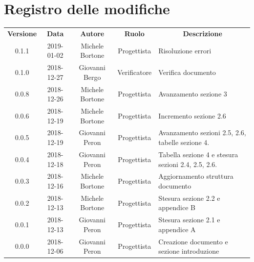 \documentclass[11pt,a4paper]{article}
\begin{document}
	
	\newpage
	\section*{\centering Registro delle modifiche}
	\begin{tabularx}{\textwidth}{ c | c | c | c | X }
		\rowcolor{LightBlue}
		\color{white}\bfseries Versione & \color{white}\bfseries Data & \color{white}\bfseries Autore & \color{white}\bfseries Ruolo & \multicolumn{1}{c}{\color{white}\bfseries Descrizione}\\[0.25cm]
		0.1.1 & 2019-01-02 & Michele Bortone & Progettista & Risoluzione errori\\ \hline
		0.1.0 & 2018-12-27 & Giovanni Bergo & Verificatore & Verifica documento\\ \hline
		0.0.8 & 2018-12-26 & Michele Bortone & Progettista & Avanzamento sezione 3\\ \hline
		0.0.6 & 2018-12-19 & Michele Bortone & Progettista & Incremento sezione 2.6\\ \hline
		0.0.5 & 2018-12-19 & Giovanni Peron & Progettista & Avanzamento sezioni 2.5, 2.6, tabelle sezione 4.\\ \hline
		0.0.4 & 2018-12-18 & Giovanni Peron & Progettista & Tabella sezione 4 e stesura sezioni 2.4, 2.5, 2.6.\\ \hline
		0.0.3 & 2018-12-16 & Michele Bortone & Progettista & Aggiornamento struttura documento\\ \hline
		0.0.2 & 2018-12-13 & Michele Bortone & Progettista & Stesura sezione 2.2  e appendice B\\ \hline
		0.0.1 & 2018-12-13 & Giovanni Peron & Progettista & Stesura sezione 2.1 e appendice A \\ \hline
		0.0.0 & 2018-12-06 & Giovanni Peron & Progettista & Creazione documento e \newline sezione introduzione \\ \hline
	
	\end{tabularx}
	\newpage
	\tableofcontents
	
	\listoffigures
	\listoftables
	
	\newpage
		
	\newpage
	
	\newpage
	
	\newpage
	
	\newpage
		
\end{document}
